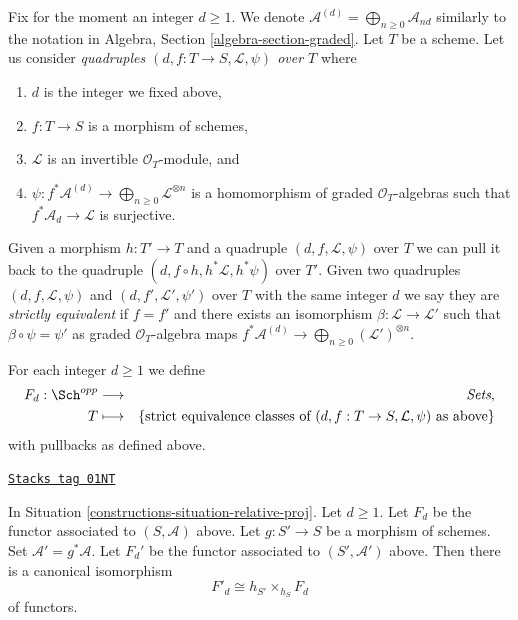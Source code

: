 \medskip\noindent
Fix for the moment an integer $d \geq 1$.
We denote $\mathcal{A}^{(d)} = \bigoplus_{n \geq 0} \mathcal{A}_{nd}$
similarly to the notation in Algebra, Section \ref{algebra-section-graded}.
Let $T$ be a scheme.
Let us consider {\it quadruples $(d, f : T \to S, \mathcal{L}, \psi)$
over $T$} where
\begin{enumerate}
\item $d$ is the integer we fixed above,
\item $f : T \to S$ is a morphism of schemes,
\item $\mathcal{L}$ is an invertible $\mathcal{O}_T$-module, and
\item
$\psi : f^*\mathcal{A}^{(d)} \to \bigoplus_{n \geq 0}\mathcal{L}^{\otimes n}$
is a homomorphism of graded $\mathcal{O}_T$-algebras
such that $f^*\mathcal{A}_d \to \mathcal{L}$ is surjective.
\end{enumerate}
Given a morphism $h : T' \to T$ and a quadruple
$(d, f, \mathcal{L}, \psi)$ over $T$ we can pull it back to the
quadruple $(d, f \circ h, h^*\mathcal{L}, h^*\psi)$ over $T'$.
Given two quadruples $(d, f, \mathcal{L}, \psi)$ and
$(d, f', \mathcal{L}', \psi')$ over $T$ with the same integer $d$
we say they are {\it strictly equivalent} if $f = f'$ and there exists
an isomorphism $\beta : \mathcal{L} \to \mathcal{L}'$
such that $\beta \circ \psi = \psi'$ as graded $\mathcal{O}_T$-algebra maps
$f^*\mathcal{A}^{(d)} \to \bigoplus_{n \geq 0} (\mathcal{L}')^{\otimes n}$.

\medskip\noindent
For each integer $d \geq 1$ we define
\begin{eqnarray*}
F_d : \Sch^{opp} & \longrightarrow & \textit{Sets}, \\
T & \longmapsto &
\{\text{strict equivalence classes of }
(d, f : T \to S, \mathcal{L}, \psi)
\text{ as above}\}
\end{eqnarray*}
with pullbacks as defined above.

\begin{lemma}
\label{constructions-lemma-proj-base-change}
\href{https://stacks.math.columbia.edu/tag/01NT}{\texttt{Stacks tag 01NT}}

In Situation \ref{constructions-situation-relative-proj}. Let $d \geq 1$.
Let $F_d$ be the functor
associated to $(S, \mathcal{A})$ above.
Let $g : S' \to S$ be a morphism of schemes.
Set $\mathcal{A}' = g^*\mathcal{A}$. Let $F_d'$ be the
functor associated to $(S', \mathcal{A}')$ above.
Then there is a canonical isomorphism
$$
F'_d \cong h_{S'} \times_{h_S} F_d
$$
of functors.
\end{lemma}

